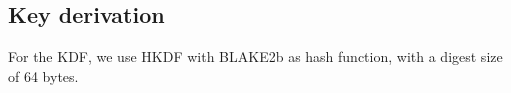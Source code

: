 \documentclass{amsart}
\begin{document}
\subsection{Key derivation}
For the KDF, we use \textsf{HKDF} with \textsf{BLAKE2b} as hash function, with a digest size of 64 bytes. 




\end{document}

